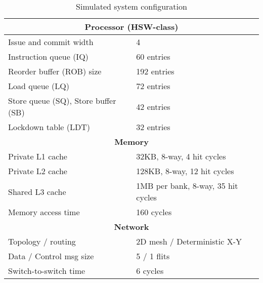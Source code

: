 \begin{table}[H]

\label{tbl:config}
\centering
\footnotesize
\begin{tabular}{ll}
\hline
\multicolumn{2}{c}{\textbf{Processor (HSW-class)}}\\
\hline
Issue and commit width & 4\\
Instruction queue (IQ)      & 60 entries\\
Reorder buffer (ROB) size               &  192 entries\\
Load queue (LQ)            & 72 entries\\
Store queue (SQ), Store buffer (SB)           & 42 entries\\
Lockdown table (LDT) & 32 entries\\
\hline
\multicolumn{2}{c}{\textbf{Memory}}\\
\hline
Private L1 cache       & 32KB, 8-way, 4 hit cycles\\
Private L2 cache       & 128KB, 8-way, 12 hit cycles\\
Shared L3 cache        & 1MB per bank, 8-way, 35 hit cycles\\
Memory access time     & 160 cycles\\
\hline
\multicolumn{2}{c}{\textbf{Network}}\\
\hline
Topology / routing      & 2D mesh / Deterministic X-Y\\
Data / Control msg size    & 5 / 1 flits\\
Switch-to-switch time   & 6 cycles\\
\hline
\end{tabular}
\caption{Simulated system configuration}
\end{table}

